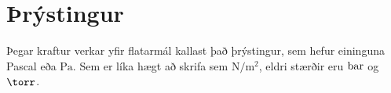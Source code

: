 \chapter{Þrýstingur}
Þegar kraftur verkar yfir flatarmál kallast það þrýstingur, sem hefur eininguna
Pascal eða $\si{\Pa}$. Sem er líka hægt að skrifa sem $\si{\N\per\m\squared}$,
eldri stærðir eru $\si{\Bar}$ og $\si{\torr}$.
